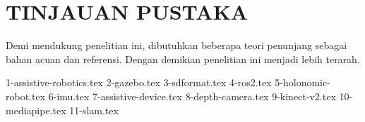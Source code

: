 \chapter{TINJAUAN PUSTAKA}
\label{chap:tinjauanpustaka}

Demi mendukung penelitian ini, dibutuhkan beberapa teori penunjang sebagai bahan acuan dan referensi.
Dengan demikian penelitian ini menjadi lebih terarah.

{1-assistive-robotics.tex}
{2-gazebo.tex}
{3-sdformat.tex}
{4-ros2.tex}
{5-holonomic-robot.tex}
{6-imu.tex}
{7-assistive-device.tex}
{8-depth-camera.tex}
{9-kinect-v2.tex}
{10-mediapipe.tex}
{11-slam.tex}
